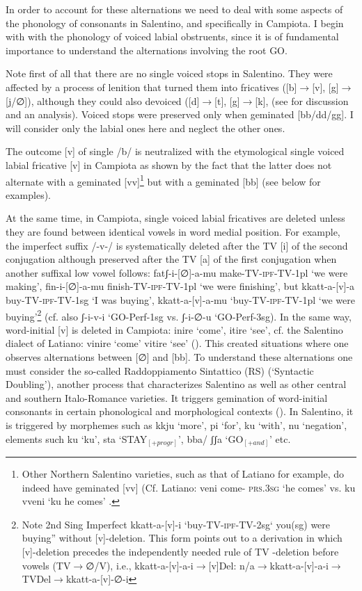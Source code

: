 \documentclass[output=paper]{langscibook}
\begin{document}
In order to account for these alternations we need to deal with some aspects of the phonology of consonants in Salentino, and specifically in Campiota.   I begin with with the phonology of voiced labial obstruents, since it is of fundamental importance to understand the alternations involving the root GO.  

Note first of all that there are no single voiced stops in Salentino.  They were affected by a process of lenition that turned them into fricatives ([b]$\rightarrow$[v], [g]$\rightarrow$ [j/∅]), although they could also devoiced ([d]$\rightarrow$[t], [g]$\rightarrow$[k], (see \citealt{calabrese1987a} for discussion and an analysis).  Voiced stops were preserved only when geminated [bb/dd/gg]. I will consider only the labial ones here and neglect the other ones.

The outcome [v] of single /b/ is neutralized with the etymological single voiced labial fricative [v] in Campiota as shown by the fact that  the latter does not alternate with a geminated [vv]\footnote{Other Northern Salentino varieties, such as that of Latiano for example, do indeed have geminated [vv] (Cf. Latiano: veni come- \textsc{prs}.\textsc{3sg} ‘he comes’ vs. ku vveni ‘ku he comes’ \citep{urgese2003a}.}  but with a geminated [bb] (see below for examples).

At the same time, in Campiota, single voiced labial fricatives are deleted unless they are found between identical vowels in word medial position.  For example, the imperfect suffix /-v-/ is systematically deleted after the TV [i] of the second conjugation although preserved after the TV [a] of the first conjugation when  another suffixal low vowel follows: fatʃ-i-[∅]-a-mu make-TV-\textsc{ipf}-TV-1pl ‘we were making’, fin-i-[∅]-a-mu finish-TV-\textsc{ipf}-TV-1pl ‘we were finishing’, but kkatt-a-[v]-a  buy-TV-\textsc{ipf}-TV-1sg ‘I was buying’, kkatt-a-[v]-a-mu ‘buy-TV-\textsc{ipf}-TV-1pl ‘we were buying’\footnote{Note 2nd Sing Imperfect kkatt-a-[v]-i ‘buy-TV-\textsc{ipf}-TV-2sg‘ you(sg) were buying” without [v]-deletion.  This form points out to a derivation in which [v]-deletion precedes the independently needed rule of TV -deletion before vowels (TV$\rightarrow$∅/V), i.e., kkatt-a-[v]-a-i$\rightarrow$[v]Del: n/a$\rightarrow$kkatt-a-[v]-a-i$\rightarrow$TVDel$\rightarrow$kkatt-a-[v]-∅-i}  (cf. also ʃ-i-v-i ‘GO-Perf-1sg vs. ʃ-i-∅-u ‘GO-Perf-3sg).  In the same way, word-initial [v] is deleted in Campiota: inire  ‘come’, itire ‘see’, cf. the Salentino dialect of Latiano: vinire ‘come’ vitire ‘see’ (\cite{urgese2003a}).   This created situations where one observes alternations between [∅] and [bb]. To understand these alternations one must consider the so-called Raddoppiamento Sintattico (RS) (‘Syntactic Doubling’), another process that characterizes Salentino as well as other central and southern Italo-Romance varieties.  It triggers gemination of word-initial consonants in certain phonological and morphological contexts (\cite{chierchia1986a, loporcaro1997}).  In Salentino, it is triggered by morphemes such as kkju ‘more’, pi ‘for’, ku ‘with’, nu ‘negation’, elements such ku ‘ku’, sta ‘STAY$_{[+progr]}$’, bba/ ʃʃa ‘GO$_{[+and]}$’ etc.
\end{document}
